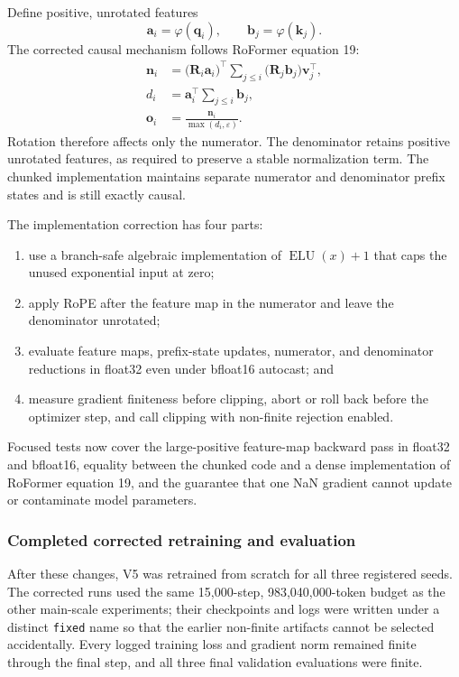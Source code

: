 \documentclass[11pt,a4paper]{article}
\theoremstyle{definition}
\theoremstyle{plain}
\newcommand{\vq}{\bm{q}}
\newcommand{\vk}{\bm{k}}
\newcommand{\vv}{\bm{v}}
\newcommand{\vo}{\bm{o}}
\newcommand{\mR}{\bm{R}}
\DeclareMathOperator{\ELU}{ELU}
\begin{document}
Define positive, unrotated features
\begin{equation}
    \bm{a}_i=\varphi(\vq_i),\qquad \bm{b}_j=\varphi(\vk_j).
\end{equation}
The corrected causal mechanism follows RoFormer equation 19:
\begin{align}
    \bm{n}_i
    &=\bigl(\mR_i\bm{a}_i\bigr)^\top
      \sum_{j\leq i}\bigl(\mR_j\bm{b}_j\bigr)\vv_j^\top,\\
    d_i
    &=\bm{a}_i^\top\sum_{j\leq i}\bm{b}_j,\\
    \vo_i&=\frac{\bm{n}_i}{\max(d_i,\varepsilon)}.
\end{align}
Rotation therefore affects only the numerator. The denominator retains positive unrotated features, as required to preserve a stable normalization term. The chunked implementation maintains separate numerator and denominator prefix states and is still exactly causal.

The implementation correction has four parts:
\begin{enumerate}
    \item use a branch-safe algebraic implementation of $\ELU(x)+1$ that caps the unused exponential input at zero;
    \item apply RoPE after the feature map in the numerator and leave the denominator unrotated;
    \item evaluate feature maps, prefix-state updates, numerator, and denominator reductions in float32 even under bfloat16 autocast; and
    \item measure gradient finiteness before clipping, abort or roll back before the optimizer step, and call clipping with non-finite rejection enabled.
\end{enumerate}
Focused tests now cover the large-positive feature-map backward pass in float32 and bfloat16, equality between the chunked code and a dense implementation of RoFormer equation 19, and the guarantee that one NaN gradient cannot update or contaminate model parameters.

\subsubsection{Completed corrected retraining and evaluation}

After these changes, V5 was retrained from scratch for all three registered seeds. The corrected runs used the same 15,000-step, 983,040,000-token budget as the other main-scale experiments; their checkpoints and logs were written under a distinct \texttt{fixed} name so that the earlier non-finite artifacts cannot be selected accidentally. Every logged training loss and gradient norm remained finite through the final step, and all three final validation evaluations were finite.
\end{document}
